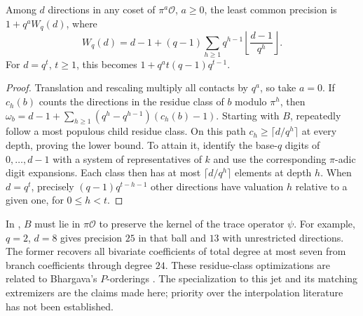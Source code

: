 \begin{corollary}\label{cor:branch-opt}
Among $d$ directions in any coset of $\pi^a\mathcal O$, $a\ge0$, the least common precision is $1+q^a W_q(d)$, where
\[
 W_q(d)=d-1+(q-1)\sum_{h\ge1} q^{h-1}\left\lfloor\frac{d-1}{q^h}\right\rfloor.
\]
For $d=q^t$, $t\ge1$, this becomes $1+q^a t(q-1)q^{t-1}$.
\end{corollary}
\begin{proof}
Translation and rescaling multiply all contacts by $q^a$, so take $a=0$. If $c_h(b)$ counts the directions in the residue class of $b$ modulo $\pi^h$, then
$\omega_b=d-1+\sum_{h\ge1}(q^h-q^{h-1})(c_h(b)-1)$.
Starting with $B$, repeatedly follow a most populous child residue class. On this path $c_h\ge\lceil d/q^h\rceil$ at every depth, proving the lower bound. To attain it, identify the base-$q$ digits of $0,\ldots,d-1$ with a system of representatives of $k$ and use the corresponding $\pi$-adic digit expansions. Each class then has at most $\lceil d/q^h\rceil$ elements at depth $h$. When $d=q^t$, precisely $(q-1)q^{t-h-1}$ other directions have valuation $h$ relative to a given one, for $0\le h<t$.
\end{proof}

In \cite[Theorem 4.6]{BS}, $B$ must lie in $\pi\mathcal O$ to preserve the kernel of the trace operator $\psi$. For example, $q=2$, $d=8$ gives precision $25$ in that ball and $13$ with unrestricted directions. The former recovers all bivariate coefficients of total degree at most seven from branch coefficients through degree $24$. These residue-class optimizations are related to Bhargava's $P$-orderings \cite{Bhargava}. The specialization to this jet and its matching extremizers are the claims made here; priority over the interpolation literature has not been established.

